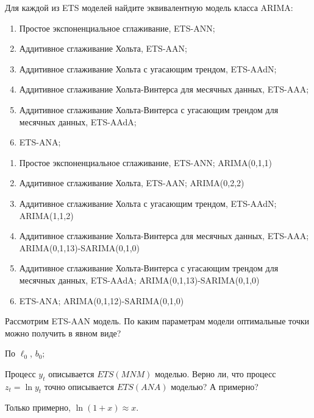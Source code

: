 \begin{problem}
Для каждой из ETS моделей найдите эквивалентную модель класса ARIMA:
	\begin{enumerate}
		\item Простое экспоненциальное сглаживание, ETS-ANN;
		\item Аддитивное сглаживание Хольта, ETS-AAN;
		\item Аддитивное сглаживание Хольта с угасающим трендом, ETS-AAdN;
		\item Аддитивное сглаживание Хольта-Винтерса для месячных данных, ETS-AAA;
		\item Аддитивное сглаживание Хольта-Винтерса с угасающим трендом для месячных данных, ETS-AAdA;
		\item ETS-ANA;
	\end{enumerate}
\begin{sol}
	\begin{enumerate}
		\item Простое экспоненциальное сглаживание, ETS-ANN; ARIMA(0,1,1)
		\item Аддитивное сглаживание Хольта, ETS-AAN; ARIMA(0,2,2)
		\item Аддитивное сглаживание Хольта с угасающим трендом, ETS-AAdN; ARIMA(1,1,2)
		\item Аддитивное сглаживание Хольта-Винтерса для месячных данных, ETS-AAA; ARIMA(0,1,13)-SARIMA(0,1,0)
		\item Аддитивное сглаживание Хольта-Винтерса с угасающим трендом для месячных данных, ETS-AAdA; ARIMA(0,1,13)-SARIMA(0,1,0)
		\item ETS-ANA; ARIMA(0,1,12)-SARIMA(0,1,0)
	\end{enumerate}
\end{sol}
\end{problem}


\begin{problem}
Рассмотрим ETS-AAN модель. По каким параметрам модели оптимальные точки можно получить в явном виде?
\begin{sol}
По $\ell_0$, $b_0$;
\end{sol}
\end{problem}

\begin{problem}
Процесс $y_t$ описывается $ETS(MNM)$ моделью. 
Верно ли, что процесс $z_t = \ln y_t$ точно описывается $ETS(ANA)$ моделью? А примерно?
\begin{sol}
  Только примерно, $\ln (1 + x) \approx x$.
\end{sol}
\end{problem}
  

